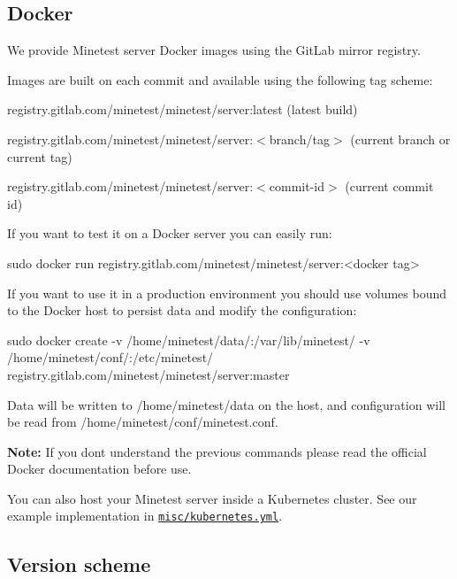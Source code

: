 \subsection*{Docker }

We provide Minetest server Docker images using the Git\+Lab mirror registry.

Images are built on each commit and available using the following tag scheme\+:


\begin{DoxyItemize}
\item {\ttfamily registry.\+gitlab.\+com/minetest/minetest/server\+:latest} (latest build)
\item {\ttfamily registry.\+gitlab.\+com/minetest/minetest/server\+:$<$branch/tag$>$} (current branch or current tag)
\item {\ttfamily registry.\+gitlab.\+com/minetest/minetest/server\+:$<$commit-\/id$>$} (current commit id)
\end{DoxyItemize}

If you want to test it on a Docker server you can easily run\+: \begin{DoxyVerb}sudo docker run registry.gitlab.com/minetest/minetest/server:<docker tag>
\end{DoxyVerb}


If you want to use it in a production environment you should use volumes bound to the Docker host to persist data and modify the configuration\+: \begin{DoxyVerb}sudo docker create -v /home/minetest/data/:/var/lib/minetest/ -v /home/minetest/conf/:/etc/minetest/ registry.gitlab.com/minetest/minetest/server:master
\end{DoxyVerb}


Data will be written to {\ttfamily /home/minetest/data} on the host, and configuration will be read from {\ttfamily /home/minetest/conf/minetest.conf}.

{\bfseries Note\+:} If you don\textquotesingle{}t understand the previous commands please read the official Docker documentation before use.

You can also host your Minetest server inside a Kubernetes cluster. See our example implementation in \href{misc/kubernetes.yml}{\tt {\ttfamily misc/kubernetes.\+yml}}.

\subsection*{Version scheme }

